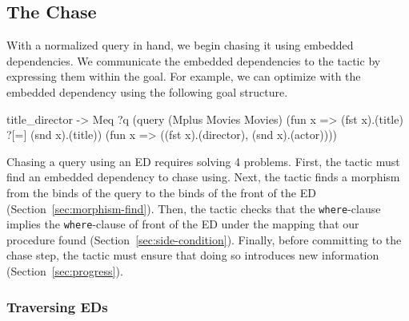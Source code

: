 \documentclass[preprint]{sigplanconf}
\begin{document}
\begin{comment}

The final result of normalization for the movies query is exactly the query presented in Section~\ref{sec:example}.
In our syntax:
\begin{coq}
query (Mplus Movies Movies)
      (fun x => (fst x).(title) ?[=] (snd x).(title))
      (fun x => ((fst x).(director), (snd x).(actor)))
\end{coq}
\end{comment}


\subsection{The Chase}
\label{sec:ltac-chase}

With a normalized query in hand, we begin chasing it using embedded dependencies.
We communicate the embedded dependencies to the tactic by expressing them within the goal.
For example, we can optimize with the  embedded dependency using the following goal structure.
\begin{coq}
title_director ->
Meq ?q (query (Mplus Movies Movies)
              (fun x => (fst x).(title) ?[=] (snd x).(title))
              (fun x => ((fst x).(director), (snd x).(actor))))
\end{coq}

Chasing a query using an ED requires solving 4 problems.
First, the tactic must find an embedded dependency to chase using.
Next, the tactic finds a morphism from the binds of the query to the binds of the front of the ED (Section~\ref{sec:morphism-find}).
Then, the tactic checks that the {\tt where}-clause implies the {\tt where}-clause of front of the ED under the mapping that our procedure found (Section~\ref{sec:side-condition}).
Finally, before committing to the chase step, the tactic must ensure that doing so introduces new information (Section~\ref{sec:progress}).

\subsubsection{Traversing EDs}
\label{sec:traverse-ed}
\end{document}
